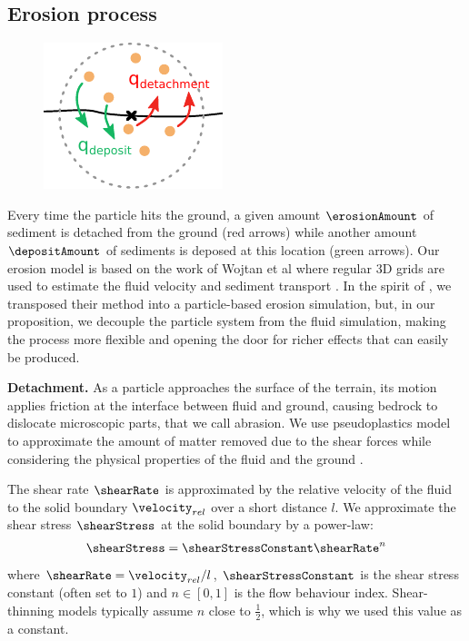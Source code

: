 \subsection{Erosion process}
\begin{figure}
\centering
\includegraphics{figures/erosion_deposition.pdf}

\end{figure}
Every time the particle hits the ground, a given amount $\erosionAmount$ of sediment is detached from the ground (red arrows) while another amount $\depositAmount$ of sediments is deposed at this location (green arrows). Our erosion model is based on the work of Wojtan et al where regular 3D grids are used to estimate the fluid velocity and sediment transport \cite{Wojtan2007}. In the spirit of \cite{Kristof2009}, we transposed their method into a particle-based erosion simulation, but, in our proposition, we decouple the particle system from the fluid simulation, making the process more flexible and opening the door for richer effects that can easily be produced. 

\textbf{Detachment.}
As a particle approaches the surface of the terrain, its motion applies friction at the interface between fluid and ground, causing bedrock to dislocate microscopic parts, that we call abrasion. We use pseudoplastics model to approximate the amount of matter removed due to the shear forces while considering the physical properties of the fluid and the ground \cite{Wojtan2007}. 

The shear rate $\shearRate$ is approximated by the relative velocity of the fluid to the solid boundary $\velocity_{rel}$ over a short distance $l$.
We approximate the shear stress $\shearStress$ at the solid boundary by a power-law:
\begin{align}\label{eq:shearStress}
\shearStress = \shearStressConstant \shearRate^n
\end{align}
where $\shearRate = \velocity_{rel}/l$, $\shearStressConstant$ is the shear stress constant (often set to $1$) and $n \in [0,1]$ is the flow behaviour index. Shear-thinning models typically assume $n$ close to $\frac{1}{2}$, which is why we used this value as a constant.  

